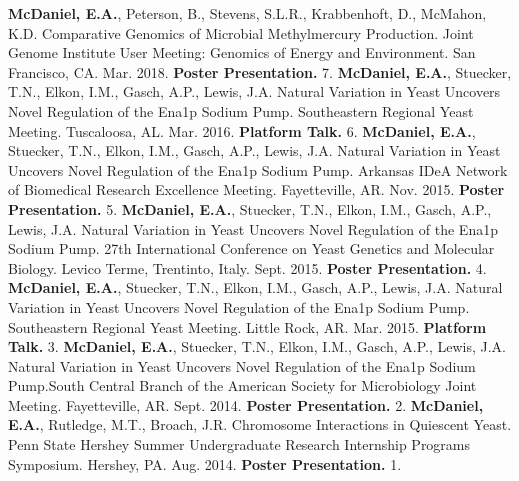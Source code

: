 


\begin{cvpubs}
    \cvpub
        {\textbf{McDaniel, E.A.}, Peterson, B., Stevens, S.L.R., Krabbenhoft, D., McMahon, K.D. Comparative Genomics of Microbial Methylmercury Production. Joint Genome Institute User Meeting: Genomics of Energy and Environment. San Francisco, CA. Mar. 2018. \textbf{Poster Presentation.}} %
        {7.} %
    \cvpub
        {\textbf{McDaniel, E.A.}, Stuecker, T.N., Elkon, I.M., Gasch, A.P., Lewis, J.A. Natural Variation in Yeast Uncovers Novel Regulation of the Ena1p Sodium Pump. Southeastern Regional Yeast Meeting. Tuscaloosa, AL. Mar. 2016. \textbf{Platform Talk.}} %
        {6.} %
        \cvpub
        {\textbf{McDaniel, E.A.}, Stuecker, T.N., Elkon, I.M., Gasch, A.P., Lewis, J.A. Natural Variation in Yeast Uncovers Novel Regulation of the Ena1p Sodium Pump. Arkansas IDeA Network of Biomedical Research Excellence Meeting. Fayetteville, AR. Nov. 2015. \textbf{Poster Presentation.}}       
        {5.}
    \cvpub
        {\textbf{McDaniel, E.A.}, Stuecker, T.N., Elkon, I.M., Gasch, A.P., Lewis, J.A. Natural Variation in Yeast Uncovers Novel Regulation of the Ena1p Sodium Pump. 27th International Conference on Yeast Genetics and Molecular Biology. Levico Terme, Trentinto, Italy. Sept. 2015. \textbf{Poster Presentation.}}
        {4.}
        \cvpub
        {\textbf{McDaniel, E.A.}, Stuecker, T.N., Elkon, I.M., Gasch, A.P., Lewis, J.A. Natural Variation in Yeast Uncovers Novel Regulation of the Ena1p Sodium Pump. Southeastern Regional Yeast Meeting. Little Rock, AR. Mar. 2015. \textbf{Platform Talk.}}
        {3.}
    \cvpub
        {\textbf{McDaniel, E.A.}, Stuecker, T.N., Elkon, I.M., Gasch, A.P., Lewis, J.A. Natural Variation in Yeast Uncovers Novel Regulation of the Ena1p Sodium Pump.South Central Branch of the American Society for Microbiology Joint Meeting. Fayetteville, AR. Sept. 2014. \textbf{Poster Presentation.}}
        {2.}
    \cvpub
        {\textbf{McDaniel, E.A.}, Rutledge, M.T., Broach, J.R. Chromosome Interactions in Quiescent Yeast. Penn State Hershey Summer Undergraduate Research Internship Programs Symposium. Hershey, PA. Aug. 2014. \textbf{Poster Presentation.}}
        {1.}
\end{cvpubs}
